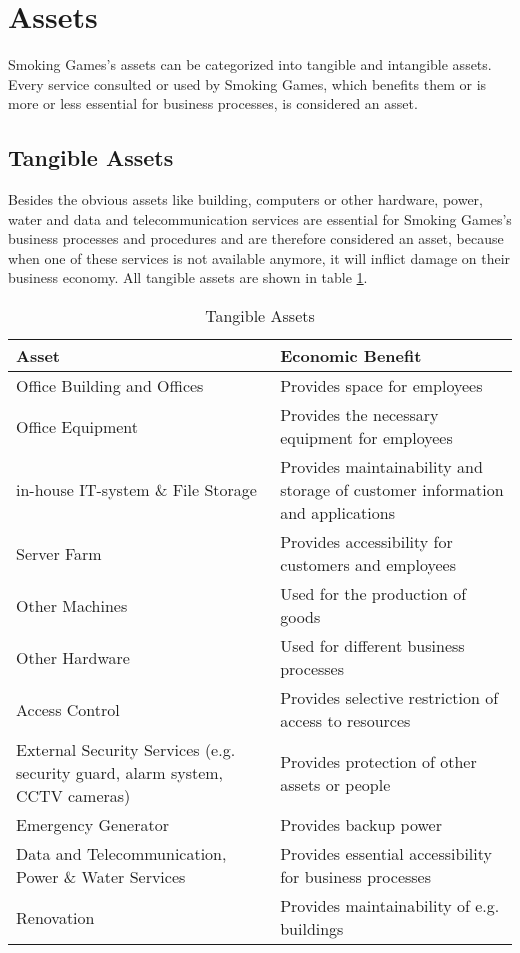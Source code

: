 \newpage
\section{Assets}
Smoking Games's assets can be categorized into tangible and intangible assets. Every service consulted or used by Smoking Games, which benefits them or is more or less essential for business processes, is considered an asset.
\subsection{Tangible Assets}
Besides the obvious assets like building, computers or other hardware, power, water and data and telecommunication services are essential for Smoking Games's business processes and procedures and are therefore considered an asset, because when one of these services is not available anymore, it will inflict damage on their business economy. All tangible assets are shown in table \ref{tab:TangibleAssets}.
\begin{table}[h]
	\centering
	\begin{tabular}{l | l}
		\textbf{Asset} & \textbf{Economic Benefit}\\\hline\hline
		\parbox[t]{6cm}{Office Building and Offices} & \parbox[t]{6cm}{Provides space for employees}\\\hline
		\parbox[t]{6cm}{Office Equipment} & \parbox[t]{6cm}{Provides the necessary equipment for employees}\\\hline
		\parbox[t]{6cm}{in-house IT-system \& File Storage} & \parbox[t]{6cm}{Provides maintainability and storage of customer information and applications}\\\hline
		\parbox[t]{6cm}{Server Farm} & \parbox[t]{6cm}{Provides accessibility for customers and employees}\\\hline
		\parbox[t]{6cm}{Other Machines} & \parbox[t]{6cm}{Used for the production of goods}\\\hline
		\parbox[t]{6cm}{Other Hardware} & \parbox[t]{6cm}{Used for different business processes}\\\hline
		\parbox[t]{6cm}{Access Control} & \parbox[t]{6cm}{Provides selective restriction of access to resources}\\\hline
		\parbox[t]{6cm}{External Security Services (e.g. security guard, alarm system, CCTV cameras)} & \parbox[t]{6cm}{Provides protection of other assets or people}\\\hline
		\parbox[t]{6cm}{Emergency Generator} & \parbox[t]{6cm}{Provides backup power}\\\hline
		\parbox[t]{6cm}{Data and Telecommunication, Power \& Water Services} & \parbox[t]{6cm}{Provides essential accessibility for business processes}\\\hline
		\parbox[t]{6cm}{Renovation} & \parbox[t]{6cm}{Provides maintainability of e.g. buildings}\\
	\end{tabular}
	\caption{Tangible Assets}\label{tab:TangibleAssets}
\end{table}

